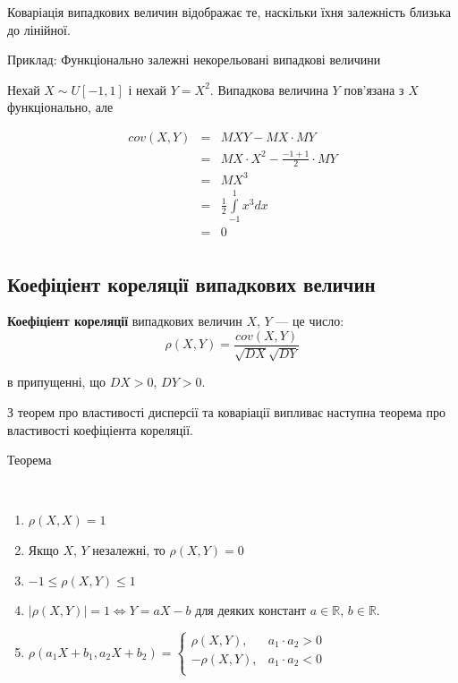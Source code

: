 \begin{remark}
    Коваріація випадкових величин відображає те, наскільки
    їхня залежність близька до лінійної.
\end{remark}


\begin{example}
    Приклад:
    Функціонально залежні некорельовані випадкові величини
    
    Нехай $X \sim U[-1, 1]$ і нехай $Y = X^2$.
    Випадкова величина $Y$ пов'язана з $X$ функціонально, але  
    
    $$\begin{array}{rcl}
        cov(X, Y) & = & MXY - MX \cdot MY \\
        & = & MX \cdot X^2 - \frac{-1 + 1}{2} \cdot MY \\
        & = & MX^3 \\
        & = & \frac{1}{2} \int\limits_{-1}^{1} x^3 dx \\
        & = & 0 \\
    \end{array}$$
\end{example}

\subsection{Коефіціент кореляції випадкових величин}

\begin{definition}
    \textbf{Коефіціент кореляції} випадкових величин $X$,
    $Y$ --- це число:
    \begin{equation}
        \rho(X, Y) = \frac{cov(X, Y)}{\sqrt{DX} \sqrt{DY}}
    \end{equation}
    
    в припущенні, що $DX > 0$, $DY > 0$. 
\end{definition}

З теорем про властивості дисперсії та коваріації випливає
наступна теорема про властивості коефіціента
кореляції.

Теорема
\begin{theorem}~
    \begin{enumerate}
        \item $\rho(X, X) = 1$
        \item Якщо $X$, $Y$ незалежні, то $\rho(X, Y) = 0$
        \item $-1 \leqslant \rho(X, Y) \leqslant 1$
        \item $|\rho(X, Y)| = 1 \Leftrightarrow Y = aX - b$
            для деяких констант $a \in \mathbb{R}$,
            $b \in \mathbb{R}$.
        \item $\rho(a_1 X + b_1, a_2 X + b_2) = \left\{ \begin{array}{ll}
            \rho(X, Y),  & a_1 \cdot a_2 > 0 \\
            -\rho(X, Y), & a_1 \cdot a_2 < 0 \\
        \end{array} \right. $
    \end{enumerate}
\end{theorem}

